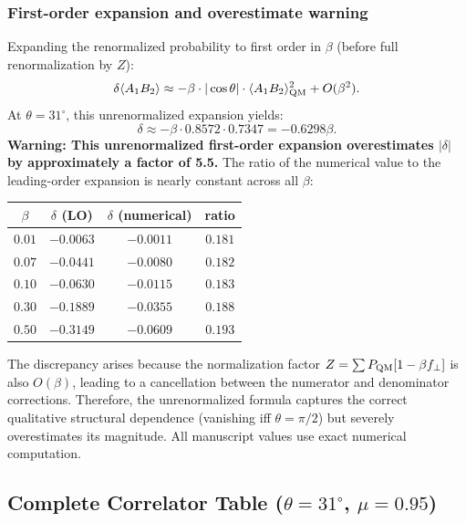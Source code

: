 \documentclass[12pt]{article}
\begin{document}
\subsubsection{First-order expansion and overestimate warning}
Expanding the renormalized probability to first order in $\beta$ (before full renormalization by $Z$):
\begin{equation}
\delta\langle A_1 B_2 \rangle \approx -\beta \cdot |\cos\theta| \cdot \langle A_1 B_2 \rangle_{\rm QM}^2 + O(\beta^2).
\end{equation}
At $\theta = 31^\circ$, this unrenormalized expansion yields:
\begin{equation}
\delta \approx -\beta \cdot 0.8572 \cdot 0.7347 = -0.6298\beta.
\end{equation}
\textbf{Warning: This unrenormalized first-order expansion overestimates $|\delta|$ by approximately a factor of 5.5.} The ratio of the numerical value to the leading-order expansion is nearly constant across all $\beta$:
\begin{center}
\begin{tabular}{cccc}
\toprule
$\beta$ & $\delta$ (LO) & $\delta$ (numerical) & ratio \\
\midrule
$0.01$ & $-0.0063$ & $-0.0011$ & $0.181$ \\
$0.07$ & $-0.0441$ & $-0.0080$ & $0.182$ \\
$0.10$ & $-0.0630$ & $-0.0115$ & $0.183$ \\
$0.30$ & $-0.1889$ & $-0.0355$ & $0.188$ \\
$0.50$ & $-0.3149$ & $-0.0609$ & $0.193$ \\
\bottomrule
\end{tabular}
\end{center}
The discrepancy arises because the normalization factor $Z = \sum P_{\rm QM} [1 - \beta f_\perp]$ is also $O(\beta)$, leading to a cancellation between the numerator and denominator corrections. Therefore, the unrenormalized formula captures the correct qualitative structural dependence (vanishing iff $\theta = \pi/2$) but severely overestimates its magnitude. All manuscript values use exact numerical computation.

\subsection{Complete Correlator Table ($\theta = 31^\circ$, $\mu = 0.95$)}
\end{document}
